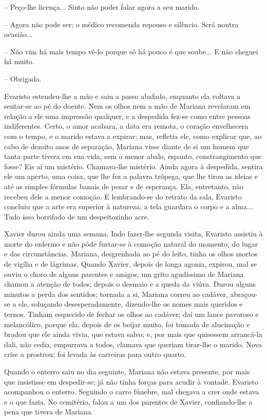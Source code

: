 -- Peço-lhe licença... Sinto não poder falar agora a seu marido.

-- Agora não pode ser; o médico recomenda repouso e silêncio. Será
noutra ocasião...

-- Não vim há mais tempo vê-lo porque só há pouco é que soube... E não
cheguei há muito.

-- Obrigada.

Evaristo estendeu-lhe a mão e saiu a passo abafado, enquanto ela voltava
a sentar-se ao pé do doente. Nem os olhos nem a mão de Mariana revelaram
em relação a ele uma impressão qualquer, e a despedida fez-se como entre
pessoas indiferentes. Certo, o amor acabara, a data era remota, o
coração envelhecera com o tempo, e o marido estava a expirar; mas,
refletia ele, como explicar que, ao cabo de dezoito anos de separação,
Mariana visse diante de si um homem que tanta parte tivera em sua vida,
sem o menor abalo, espanto, constrangimento que fosse? Eis aí um
mistério. Chamava-lhe mistério. Ainda agora à despedida, sentira ele um
aperto, uma coisa, que lhe fez a palavra trôpega, que lhe tirou as
ideias e até as simples fórmulas banais de pesar e de esperança. Ela,
entretanto, não recebeu dele a menor comoção. E lembrando-se do retrato
da sala, Evaristo concluiu que a arte era superior à natureza; a tela
guardara o corpo e a alma... Tudo isso borrifado de um despeitozinho
acre.

Xavier durou ainda uma semana. Indo fazer-lhe segunda visita, Evaristo
assistiu à morte do enfermo e não pôde furtar-se à comoção natural do
momento, do lugar e das circunstâncias. Mariana, desgrenhada ao pé do
leito, tinha os olhos mortos de vigília e de lágrimas. Quando Xavier,
depois de longa agonia, expirou, mal se ouviu o choro de alguns parentes
e amigos; um grito agudíssimo de Mariana chamou a atenção de todos;
depois o desmaio e a queda da viúva. Durou alguns minutos a perda dos
sentidos; tornada a si, Mariana correu ao cadáver, abraçou-se a ele,
soluçando desesperadamente, dizendo-lhe os nomes mais queridos e ternos.
Tinham esquecido de fechar os olhos ao cadáver; daí um lance pavoroso e
melancólico, porque ela, depois de os beijar muito, foi tomada de
alucinação e bradou que ele ainda vivia, que estava salvo; e, por mais
que quisessem arrancá-la dali, não cedia, empurrava a todos, clamava que
queriam tirar-lhe o marido. Nova crise a prostrou; foi levada às
carreiras para outro quarto.

Quando o enterro saiu no dia seguinte, Mariana não estava presente, por
mais que insistisse em despedir-se; já não tinha forças para acudir à
vontade. Evaristo acompanhou o enterro. Seguindo o carro fúnebre, mal
chegava a crer onde estava e o que fazia. No cemitério, falou a um dos
parentes de Xavier, confiando-lhe a pena que tivera de Mariana.

